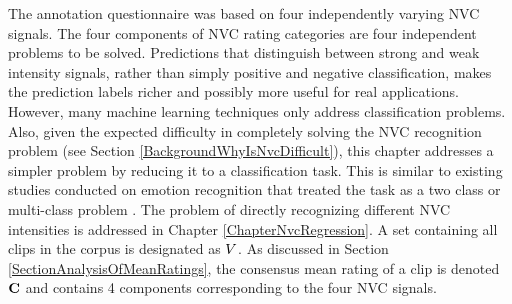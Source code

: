 The annotation questionnaire was based on four independently varying \ac{NVC} signals. %
The four components of \ac{NVC} rating categories are four independent problems to be solved.
Predictions that distinguish between strong and weak intensity signals, rather than simply positive and negative classification, makes the prediction labels richer and possibly more useful for real applications. However, many machine learning techniques only address classification problems. Also, given the expected difficulty in completely solving the \ac{NVC} recognition problem (see Section \ref{BackgroundWhyIsNvcDifficult}), this chapter addresses a simpler problem by reducing it to a classification task. This is similar to existing studies conducted on emotion recognition that treated the task as a two class \cite{Rosenblum1996} or multi-class problem \cite{Cohen2000}. The problem of directly recognizing different \ac{NVC} intensities is addressed in Chapter \ref{ChapterNvcRegression}. A set containing all clips in the corpus is designated as $V$. As discussed in Section \ref{SectionAnalysisOfMeanRatings}, the consensus mean rating of a clip is denoted $\textbf{C}$ and contains 4 components corresponding to the four \ac{NVC} signals.

